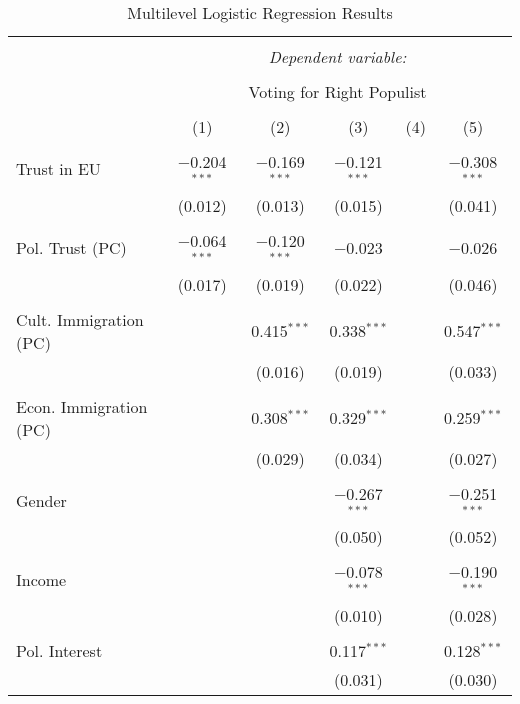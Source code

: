 
\begin{table}[!htbp] \centering 
  \caption{Multilevel Logistic Regression Results} 
  \label{} 
 \footnotesize
\centering
\begin{tabular}{@{\extracolsep{5pt}}lccccc} 
\\[-1.8ex]\hline 
\hline \\[-1.8ex] 
 & \multicolumn{5}{c}{\textit{Dependent variable:}} \\ 
\cline{2-6} 
\\[-1.8ex] & \multicolumn{5}{c}{Voting for Right Populist} \\ 
\\[-1.8ex] & (1) & (2) & (3) & (4) & (5)\\ 
\hline \\[-1.8ex] 
 Trust in EU & $-$0.204$^{***}$ & $-$0.169$^{***}$ & $-$0.121$^{***}$ &  & $-$0.308$^{***}$ \\ 
  & (0.012) & (0.013) & (0.015) &  & (0.041) \\ 
  & & & & & \\ 
 Pol. Trust (PC) & $-$0.064$^{***}$ & $-$0.120$^{***}$ & $-$0.023 &  & $-$0.026 \\ 
  & (0.017) & (0.019) & (0.022) &  & (0.046) \\ 
  & & & & & \\ 
 Cult. Immigration (PC) &  & 0.415$^{***}$ & 0.338$^{***}$ &  & 0.547$^{***}$ \\ 
  &  & (0.016) & (0.019) &  & (0.033) \\ 
  & & & & & \\ 
 Econ. Immigration (PC) &  & 0.308$^{***}$ & 0.329$^{***}$ &  & 0.259$^{***}$ \\ 
  &  & (0.029) & (0.034) &  & (0.027) \\ 
  & & & & & \\ 
 Gender &  &  & $-$0.267$^{***}$ &  & $-$0.251$^{***}$ \\ 
  &  &  & (0.050) &  & (0.052) \\ 
  & & & & & \\ 
 Income &  &  & $-$0.078$^{***}$ &  & $-$0.190$^{***}$ \\ 
  &  &  & (0.010) &  & (0.028) \\ 
  & & & & & \\ 
 Pol. Interest &  &  & 0.117$^{***}$ &  & 0.128$^{***}$ \\ 
  &  &  & (0.031) &  & (0.030) \\ 

\end{tabular}
\end{table}

